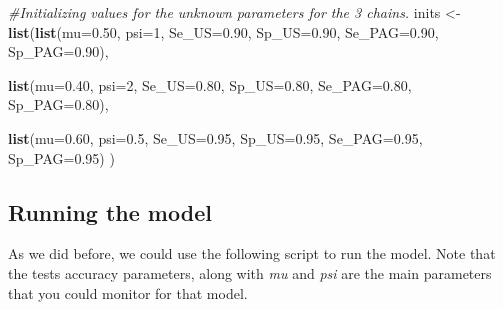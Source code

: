 \documentclass[
]{book}
\newenvironment{Shaded}{\begin{snugshade}}{\end{snugshade}}
\newcommand{\AttributeTok}[1]{\textcolor[rgb]{0.13,0.29,0.53}{#1}}
\newcommand{\CommentTok}[1]{\textcolor[rgb]{0.56,0.35,0.01}{\textit{#1}}}
\newcommand{\DecValTok}[1]{\textcolor[rgb]{0.00,0.00,0.81}{#1}}
\newcommand{\FloatTok}[1]{\textcolor[rgb]{0.00,0.00,0.81}{#1}}
\newcommand{\FunctionTok}[1]{\textcolor[rgb]{0.13,0.29,0.53}{\textbf{#1}}}
\newcommand{\NormalTok}[1]{#1}
\newcommand{\OtherTok}[1]{\textcolor[rgb]{0.56,0.35,0.01}{#1}}
\begin{document}
\begin{Shaded}
\begin{Highlighting}[]
\CommentTok{\#Initializing values for the unknown parameters for the 3 chains.}
\NormalTok{inits }\OtherTok{\textless{}{-}} \FunctionTok{list}\NormalTok{(}\FunctionTok{list}\NormalTok{(}\AttributeTok{mu=}\FloatTok{0.50}\NormalTok{,}
                   \AttributeTok{psi=}\DecValTok{1}\NormalTok{,}
                   \AttributeTok{Se\_US=}\FloatTok{0.90}\NormalTok{,}
                   \AttributeTok{Sp\_US=}\FloatTok{0.90}\NormalTok{,}
                   \AttributeTok{Se\_PAG=}\FloatTok{0.90}\NormalTok{,}
                   \AttributeTok{Sp\_PAG=}\FloatTok{0.90}\NormalTok{),}
              
              \FunctionTok{list}\NormalTok{(}\AttributeTok{mu=}\FloatTok{0.40}\NormalTok{,}
                   \AttributeTok{psi=}\DecValTok{2}\NormalTok{,}
                   \AttributeTok{Se\_US=}\FloatTok{0.80}\NormalTok{,}
                   \AttributeTok{Sp\_US=}\FloatTok{0.80}\NormalTok{,}
                   \AttributeTok{Se\_PAG=}\FloatTok{0.80}\NormalTok{,}
                   \AttributeTok{Sp\_PAG=}\FloatTok{0.80}\NormalTok{),}
              
              \FunctionTok{list}\NormalTok{(}\AttributeTok{mu=}\FloatTok{0.60}\NormalTok{,}
                   \AttributeTok{psi=}\FloatTok{0.5}\NormalTok{,}
                   \AttributeTok{Se\_US=}\FloatTok{0.95}\NormalTok{,}
                   \AttributeTok{Sp\_US=}\FloatTok{0.95}\NormalTok{,}
                   \AttributeTok{Se\_PAG=}\FloatTok{0.95}\NormalTok{,}
                   \AttributeTok{Sp\_PAG=}\FloatTok{0.95}\NormalTok{)}
\NormalTok{)}
\end{Highlighting}
\end{Shaded}

\subsection{Running the model}\label{running-the-model}

As we did before, we could use the following script to run the model. Note that the tests accuracy parameters, along with \emph{mu} and \emph{psi} are the main parameters that you could monitor for that model.
\end{document}
